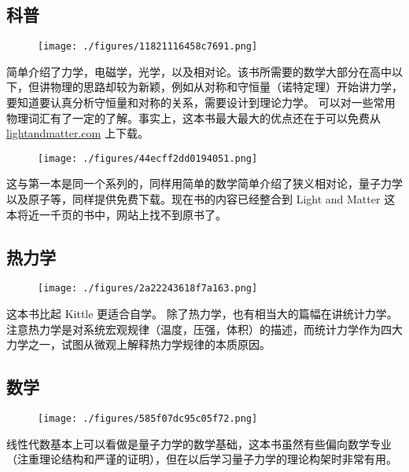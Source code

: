
\begin{issues}
\issueDraft
\end{issues}

\subsection{科普}
\begin{figure}[ht]
\centering
\texttt{[image: ./figures/11821116458c7691.png]}
\caption{} \label{fig_PhText_4}
\end{figure}
简单介绍了力学，电磁学，光学，以及相对论。该书所需要的数学大部分在高中以下，但讲物理的思路却较为新颖，例如从对称和守恒量（诺特定理）开始讲力学，要知道要认真分析守恒量和对称的关系，需要设计到理论力学。 可以对一些常用物理词汇有了一定的了解。事实上，这本书最大最大的优点还在于可以免费从 \href{https://lightandmatter.com/}{lightandmatter.com} 上下载。

\begin{figure}[ht]
\centering
\texttt{[image: ./figures/44ecff2dd0194051.png]}
\caption{} \label{fig_PhText_9}
\end{figure}
这与第一本是同一个系列的，同样用简单的数学简单介绍了狭义相对论，量子力学以及原子等，同样提供免费下载。现在书的内容已经整合到 Light and Matter 这本将近一千页的书中，网站上找不到原书了。

\subsection{热力学}
\begin{figure}[ht]
\centering
\texttt{[image: ./figures/2a22243618f7a163.png]}
\caption{} \label{fig_PhText_1}
\end{figure}
这本书比起 Kittle 更适合自学。 除了热力学，也有相当大的篇幅在讲统计力学。注意热力学是对系统宏观规律（温度，压强，体积）的描述，而统计力学作为四大力学之一，试图从微观上解释热力学规律的本质原因。

\subsection{数学}

\begin{figure}[ht]
\centering
\texttt{[image: ./figures/585f07dc95c05f72.png]}
\caption{} \label{fig_PhText_7}
\end{figure}
线性代数基本上可以看做是量子力学的数学基础，这本书虽然有些偏向数学专业（注重理论结构和严谨的证明），但在以后学习量子力学的理论构架时非常有用。

